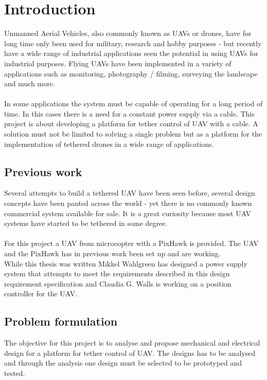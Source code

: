 \chapter{Introduction}

Unmanned Aerial Vehicles, also commonly known as UAVs or drones, have for long time only been used for military, research and hobby purposes - but recently have a wide range of industrial applications seen the potential in using UAVs for industrial purposes.
Flying UAVs have been implemented in a variety of applications such as monitoring, photography / filming, surveying the landscape and much more.\\
\\
In some applications the system must be capable of operating for a long period of time. In this cases there is a need for a constant power supply via a cable. This project is about developing a platform for tether control of UAV with a cable.
A solution must not be limited to solving a single problem but as a platform for the implementation of tethered drones in a wide range of applications.


\section{Previous work}
Several attempts to build a tethered UAV have been seen before, several design concepts have been panted across the world - yet there is no commonly known commercial system available for sale. It is a great curiosity because most UAV systems have started to be tethered in some degree.\\
\\
For this project a UAV from microcopter with a PixHawk is provided. The UAV and the PixHawk has in previous work been set up and are working.\\
\noindent
While this thesis was written Mikkel Wahlgreen has designed a power supply system \cite{Wahlgreen2014} that attempts to meet the requirements described in this design requirement specification and Claudia G. Walls is working on a position controller for the UAV.\\
 


\section{Problem formulation} 

The objective for this project is to analyse and propose mechanical and electrical design for a platform for tether control of UAV. The designs has to be analysed and through the analysis one design must be selected to be prototyped and tested.

